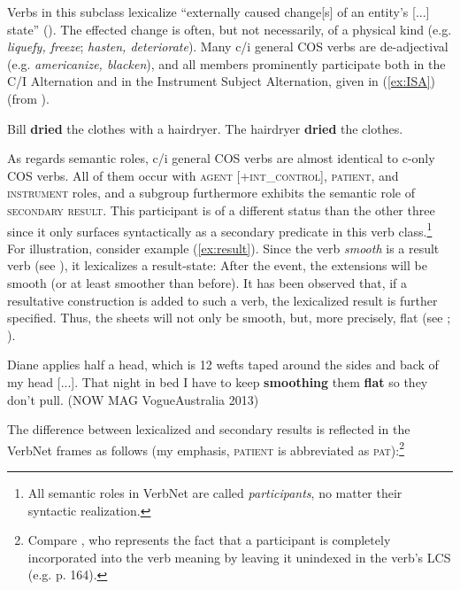 Verbs in this subclass lexicalize ``externally caused change[s] of an entity's [...] state'' (\citealt[246]{Levin.1993}). The effected change is often, but not necessarily, of a physical kind (e.g. \textit{liquefy, freeze}; \textit{hasten, deteriorate}). Many c/i general COS verbs are de-adjectival (e.g. \textit{americanize, blacken}), and all members prominently participate both in the C/I Alternation and in the Instrument Subject Alternation, given in (\ref{ex:ISA}) (from \citealt[245]{Levin.1993}). 

\begin{exe}
  \ex \label{ex:ISA}
  \ea Bill \textbf{dried} the clothes with a hairdryer. 
  \ex The hairdryer \textbf{dried} the clothes.
  \z
\end{exe}

\noindent As regards semantic roles, c/i general COS verbs are almost identical to c-only COS verbs. All of them occur with \textsc{agent [+int\_control], patient,} and \textsc{instrument} roles, and a subgroup furthermore exhibits the semantic role of \textsc{secondary result}. This participant is of a different status than the other three since it only surfaces syntactically as a secondary predicate in this verb class.\footnote{All semantic roles in VerbNet are called \textit{participants}, no matter their syntactic realization.} For illustration, consider example (\ref{ex:result}). Since the verb \textit{smooth} is a result verb (see ), it lexicalizes a result-state: After the event, the extensions will be smooth (or at least smoother than before). It has been observed that, if a resultative construction is added to such a verb, the lexicalized result is further specified. Thus, the sheets will not only be smooth, but, more precisely, flat (see \citealt[50]{Levin.1995}; \citealt[7]{Levin.2013}). 

\begin{exe}
  \ex \label{ex:result} Diane applies half a head, which is 12 wefts taped around the sides and back of my head [...]. That night in bed I have to keep \textbf{smoothing} them \textbf{flat} so they don't pull. {\small(\acs{NOW} MAG VogueAustralia 2013)}
\end{exe}

\noindent The difference between lexicalized and secondary results is reflected in the VerbNet frames as follows (my emphasis, \textsc{patient} is abbreviated as \textsc{pat}):\footnote{Compare \citet{Jackendoff.1990}, who represents the fact that a participant is completely incorporated into the verb meaning by leaving it unindexed in the verb's LCS (e.g. p. 164).} 


